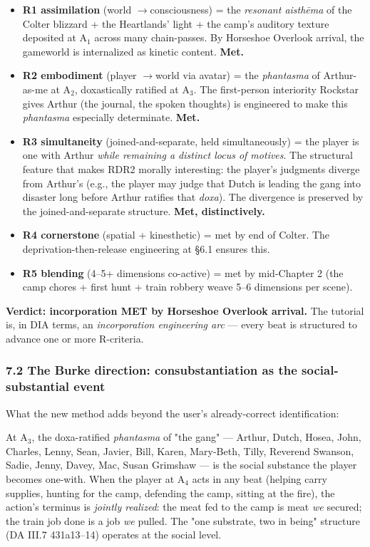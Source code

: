 \documentclass[11pt]{report}
\begin{document}
\begin{itemize}
\item \textbf{R1 assimilation} (world $\rightarrow$\allowbreak  consciousness) = the \textit{resonant aisthēma} of the Colter blizzard + the Heartlands' light + the camp's auditory texture deposited at A$_1$ across many chain-passes. By Horseshoe Overlook arrival, the gameworld is internalized as kinetic content. \textbf{Met.}
\item \textbf{R2 embodiment} (player $\rightarrow$\allowbreak  world via avatar) = the \textit{phantasma} of Arthur-as-me at A$_2$, doxastically ratified at A$_3$. The first-person interiority Rockstar gives Arthur (the journal, the spoken thoughts) is engineered to make this \textit{phantasma} especially determinate. \textbf{Met.}
\item \textbf{R3 simultaneity} (joined-and-separate, held simultaneously) = the player is one with Arthur \textit{while remaining a distinct locus of motives}. The structural feature that makes RDR2 morally interesting: the player's judgments diverge from Arthur's (e.g., the player may judge that Dutch is leading the gang into disaster long before Arthur ratifies that \textit{doxa}). The divergence is preserved by the joined-and-separate structure. \textbf{Met, distinctively.}
\item \textbf{R4 cornerstone} (spatial + kinesthetic) = met by end of Colter. The deprivation-then-release engineering at §6.1 ensures this.
\item \textbf{R5 blending} (4–5+ dimensions co-active) = met by mid-Chapter 2 (the camp chores + first hunt + train robbery weave 5–6 dimensions per scene).
\end{itemize}


\textbf{Verdict: incorporation MET by Horseshoe Overlook arrival.} The tutorial is, in DIA terms, an \textit{incorporation engineering arc} — every beat is structured to advance one or more R-criteria.


\subsubsection{7.2 The Burke direction: consubstantiation as the social-substantial event}


What the new method adds beyond the user's already-correct identification:


\begin{diabox}
At A$_3$, the doxa-ratified \textit{phantasma} of "the gang" — Arthur, Dutch, Hosea, John, Charles, Lenny, Sean, Javier, Bill, Karen, Mary-Beth, Tilly, Reverend Swanson, Sadie, Jenny, Davey, Mac, Susan Grimshaw — is the social substance the player becomes one-with. When the player at A$_4$ acts in any beat (helping carry supplies, hunting for the camp, defending the camp, sitting at the fire), the action's terminus is \textit{jointly realized}: the meat fed to the camp is meat \textit{we} secured; the train job done is a job \textit{we} pulled. The "one substrate, two in being" structure (DA III.7 431a13–14) operates at the social level.

\end{diabox}
\end{document}
